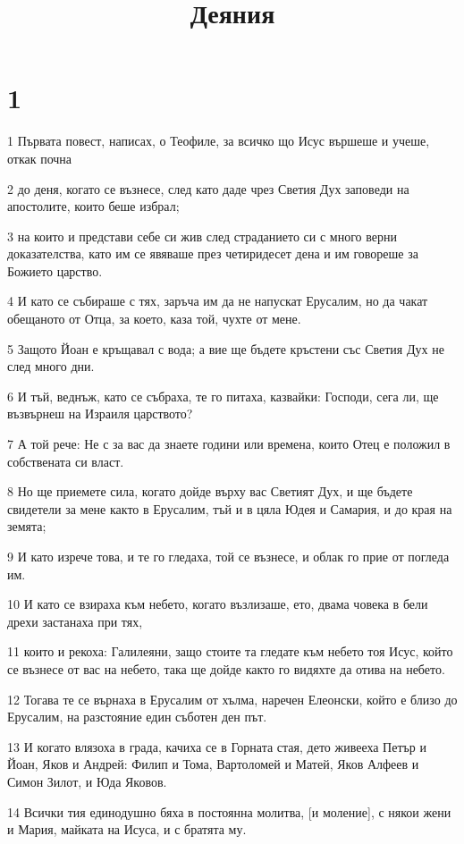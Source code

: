 

\title{Деяния}


\chapter{1}

\par 1 Първата повест, написах, о Теофиле, за всичко що Исус вършеше и учеше, откак почна
\par 2 до деня, когато се възнесе, след като даде чрез Светия Дух заповеди на апостолите, които беше избрал;
\par 3 на които и представи себе си жив след страданието си с много верни доказателства, като им се явяваше през четиридесет дена и им говореше за Божието царство.
\par 4 И като се събираше с тях, заръча им да не напускат Ерусалим, но да чакат обещаното от Отца, за което, каза той, чухте от мене.
\par 5 Защото Йоан е кръщавал с вода; а вие ще бъдете кръстени със Светия Дух не след много дни.
\par 6 И тъй, веднъж, като се събраха, те го питаха, казвайки: Господи, сега ли, ще възвърнеш на Израиля царството?
\par 7 А той рече: Не с за вас да знаете години или времена, които Отец е положил в собствената си власт.
\par 8 Но ще приемете сила, когато дойде върху вас Светият Дух, и ще бъдете свидетели за мене както в Ерусалим, тъй и в цяла Юдея и Самария, и до края на земята;
\par 9 И като изрече това, и те го гледаха, той се възнесе, и облак го прие от погледа им.
\par 10 И като се взираха към небето, когато възлизаше, ето, двама човека в бели дрехи застанаха при тях,
\par 11 които и рекоха: Галилеяни, защо стоите та гледате към небето тоя Исус, който се възнесе от вас на небето, така ще дойде както го видяхте да отива на небето.
\par 12 Тогава те се върнаха в Ерусалим от хълма, наречен Елеонски, който е близо до Ерусалим, на разстояние един съботен ден път.
\par 13 И когато влязоха в града, качиха се в Горната стая, дето живееха Петър и Йоан, Яков и Андрей: Филип и Тома, Вартоломей и Матей, Яков Алфеев и Симон Зилот, и Юда Яковов.
\par 14 Всички тия единодушно бяха в постоянна молитва, [и моление], с някои жени и Мария, майката на Исуса, и с братята му.
